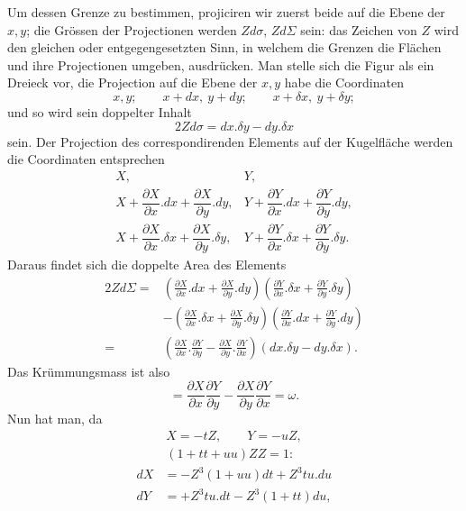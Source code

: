 \par{}%
\noindent\hspace*{1.2em}Um dessen Grenze zu bestimmen, projiciren wir zuerst beide auf die Ebene der $x,y$; die Grössen der Projectionen werden $Zd\sigma$, $Zd\Sigma$ sein: das Zeichen von $Z$ wird den gleichen oder entgegengesetzten Sinn, in welchem die Grenzen die Flächen und ihre Projectionen umgeben, ausdrücken. Man stelle sich die Figur als ein Dreieck vor, die Projection auf die Ebene der $x,y$ habe die Coordinaten
\[
x,y;\qquad x+dx,\ y+dy;\qquad x+\delta x,\ y+\delta y;
\]
und so wird sein doppelter Inhalt
\[
2Zd\sigma=dx.\delta y-dy.\delta x
\]
sein. Der Projection des correspondirenden Elements auf der Kugelfläche werden die Coordinaten entsprechen
\[
\begin{array}{cc}
X,&Y,\\[4pt]
X+\dfrac{\partial X}{\partial x}.dx+\dfrac{\partial X}{\partial y}.dy,&Y+\dfrac{\partial Y}{\partial x}.dx+\dfrac{\partial Y}{\partial y}.dy,\\[6pt]
X+\dfrac{\partial X}{\partial x}.\delta x+\dfrac{\partial X}{\partial y}.\delta y,&Y+\dfrac{\partial Y}{\partial x}.\delta x+\dfrac{\partial Y}{\partial y}.\delta y.
\end{array}
\]
Daraus findet sich die doppelte Area des Elements
\[
\begin{aligned}
2Zd\Sigma={}&\left(\frac{\partial X}{\partial x}.dx+\frac{\partial X}{\partial y}.dy\right)\left(\frac{\partial Y}{\partial x}.\delta x+\frac{\partial Y}{\partial y}.\delta y\right)\\
&-\left(\frac{\partial X}{\partial x}.\delta x+\frac{\partial X}{\partial y}.\delta y\right)\left(\frac{\partial Y}{\partial x}.dx+\frac{\partial Y}{\partial y}.dy\right)\\
={}&\left(\frac{\partial X}{\partial x}.\frac{\partial Y}{\partial y}-\frac{\partial X}{\partial y}.\frac{\partial Y}{\partial x}\right)(dx.\delta y-dy.\delta x).
\end{aligned}
\]
Das Krümmungsmass ist also
\[
=\frac{\partial X}{\partial x}\frac{\partial Y}{\partial y}-\frac{\partial X}{\partial y}\frac{\partial Y}{\partial x}=\omega.
\]
Nun hat man, da
\[
\begin{gathered}
X=-tZ,\qquad Y=-uZ,\\
(1+tt+uu)ZZ=1:
\end{gathered}
\]
\[
\begin{aligned}
dX&=-Z^{3}(1+uu)dt+Z^{3}tu.du\\
dY&=+Z^{3}tu.dt-Z^{3}(1+tt)du,
\end{aligned}
\]
